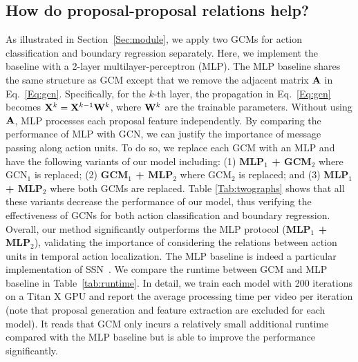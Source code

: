 \documentclass[10pt,journal,compsoc]{IEEEtran}
\begin{document}
	\subsection{How do proposal-proposal relations help?}
	\label{Sec:mlp}
	As illustrated in Section~\ref{Sec:module}, we apply two GCMs for action classification and boundary regression separately. 
	Here, we implement the baseline with a 2-layer multilayer-perceptron (MLP). The MLP baseline shares the same structure as GCM except that we remove the adjacent matrix ${\bf A}$ in Eq.~\eqref{Eq:gcn}. Specifically, for the $k$-th layer, the propagation in Eq.~\eqref{Eq:gcn} becomes ${\bf X}^{k}={\bf X}^{k-1}{\bf W}^k$, where ${\bf W}^k$ are the trainable parameters. 
	Without using ${\bf A}$, MLP processes each proposal feature independently. By comparing the performance of MLP with GCN, we can justify the importance of message passing along action units. 
	To do so, we replace each GCM with an MLP and have the following variants of our model including: (1) \textbf{MLP$_1$ + GCM$_2$} where GCN$_1$ is replaced; (2) \textbf{GCM$_1$ + MLP$_2$} where GCM$_2$ is replaced; and (3) \textbf{MLP$_1$ + MLP$_2$} where both GCMs are replaced.
	Table \ref{Tab:twographs} shows that all these variants decrease the performance of our model, thus verifying the effectiveness of GCNs for both action classification and boundary regression. 
	Overall, our method significantly outperforms the MLP protocol (\ie \textbf{MLP$_1$ + MLP$_2$}), validating the importance of considering the relations between action units in temporal action localization. The MLP baseline is indeed a particular implementation of SSN~\cite{zhao2017temporal}. We compare the runtime between GCM and MLP baseline in Table~\ref{tab:runtime}. In detail, we train each model with 200 iterations on a Titan X GPU and report the average processing time per video per iteration (note that proposal generation and feature extraction are excluded for each model).
	It reads that GCM only incurs a relatively small additional runtime compared with the MLP baseline but is able to improve the performance significantly. 
	
\end{document}
